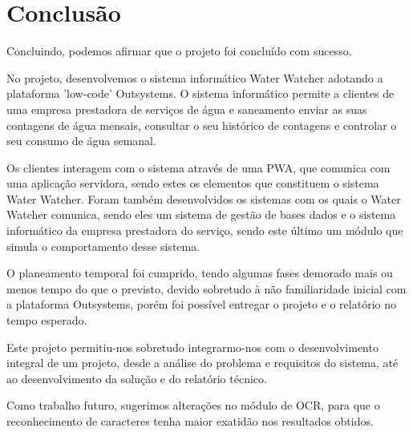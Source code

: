 \chapter{Conclusão} \label{cap:conclusao}

Concluindo, podemos afirmar que o projeto foi concluído com sucesso.\par
No projeto, desenvolvemos o sistema informático Water Watcher adotando a plataforma 'low-code' Outsystems. O sistema informático permite a clientes de uma empresa prestadora de serviços de água e saneamento enviar as suas contagens de água mensais, consultar o seu histórico de contagens e controlar o seu consumo de água semanal.\par
 Os clientes interagem com o sistema através de uma PWA, que comunica com uma aplicação servidora, sendo estes os elementos que constituem o sistema Water Watcher. Foram também desenvolvidos os sistemas com os quais o Water Watcher comunica, sendo eles um sistema de gestão de bases dados e o sistema informático da empresa prestadora do serviço, sendo este último um módulo que simula o comportamento desse sistema.\par
O planeamento temporal foi cumprido, tendo algumas fases demorado mais ou menos tempo do que o previsto, devido sobretudo à não familiaridade inicial com a plataforma Outsystems, porém foi possível entregar o projeto e o relatório no tempo esperado.\par
Este projeto permitiu-nos sobretudo integrarmo-nos com o desenvolvimento integral de um projeto, desde a análise do problema e requisitos do sistema, até ao desenvolvimento da solução e do relatório técnico.\par
Como trabalho futuro, sugerimos alterações no módulo de OCR, para que o reconhecimento de caracteres tenha maior exatidão nos resultados obtidos. 

